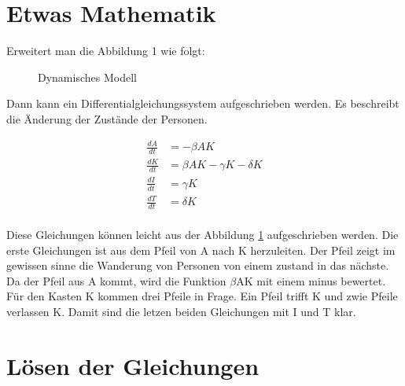 \documentclass[11pt, a4paper]{article}
\begin{document}
\newpage
\section{Etwas Mathematik}
Erweitert man die Abbildung 1 wie folgt:
\begin{figure}[h]
\centering
{}
\caption{Dynamisches Modell}
\label{fig:dynModel}
\end{figure}

Dann kann ein Differentialgleichungssystem aufgeschrieben werden. Es beschreibt die
Änderung der Zustände der Personen.

\begin{equation}
    \begin{aligned}
        \frac{dA}{dt} &= -\beta AK                      \\[5pt]
        \frac{dK}{dt} &= \beta AK - \gamma K - \delta K \\[5pt]
        \frac{dI}{dt} &= \gamma K                       \\[5pt]
        \frac{dT}{dt} &= \delta K                       \\[10pt]
    \end{aligned}
\end{equation}

Diese Gleichungen können leicht aus der Abbildung \ref{fig:dynModel} aufgeschrieben werden.
Die erste Gleichungen ist aus dem Pfeil von A nach K herzuleiten. Der Pfeil zeigt im
gewissen sinne die Wanderung von Personen von einem zustand in das nächste. Da der Pfeil
aus A kommt, wird die Funktion $\beta$AK mit einem minus bewertet. Für den Kasten K kommen
drei Pfeile in Frage. Ein Pfeil trifft K und zwie Pfeile verlassen K. Damit sind die letzen
beiden Gleichungen mit I und T klar.

\section{Lösen der Gleichungen}
\end{document}
